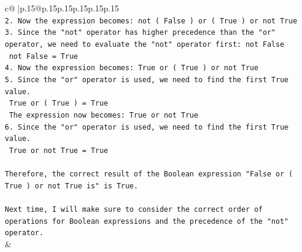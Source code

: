 \documentclass{article}
\begin{document}
{\begin{supertabular}{c@{$\;$}|p{.15\linewidth}@{}p{.15\linewidth}p{.15\linewidth}p{.15\linewidth}p{.15\linewidth}p{.15\linewidth}}
{{{\\ 
\texttt{2. Now the expression becomes: not ( False ) or ( True ) or not True} \\
\texttt{3. Since the "not" operator has higher precedence than the "or" operator, we need to evaluate the "not" operator first: not False} \\
\texttt{   not False = True} \\
\texttt{4. Now the expression becomes: True or ( True ) or not True} \\
\texttt{5. Since the "or" operator is used, we need to find the first True value. } \\
\texttt{   True or ( True ) = True} \\
\texttt{   The expression now becomes: True or not True} \\
\texttt{6. Since the "or" operator is used, we need to find the first True value. } \\
\texttt{   True or not True = True} \\
\\ 
\texttt{Therefore, the correct result of the Boolean expression "False or ( True ) or not True is" is True. } \\
\\ 
\texttt{Next time, I will make sure to consider the correct order of operations for Boolean expressions and the precedence of the "not" operator.} \\
            }
        }
    }
    & \\ \\

\end{supertabular}
}
\end{document}
